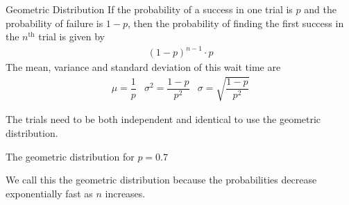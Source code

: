 \documentclass{beamer}
\begin{document}
\begin{frame}
  \begin{block}{Geometric Distribution}
    If the probability of a success in one trial is $p$ and the probability of failure is $1-p$, then the probability of finding the first success in the ${n}^{\text{th}}$ trial is given by
    \begin{equation*}
      \begin{aligned}
        {(1-p)}^{n-1}\cdot p
      \end{aligned}
    \end{equation*}
    The mean, variance and standard deviation of this wait time are
    \begin{equation*}
      \begin{array}{lll}
        \mu=\dfrac{1}{p} &
        \sigma^2=\dfrac{1-p}{p^2} &
        \sigma=\sqrt{\dfrac{1-p}{p^2}}
      \end{array}
    \end{equation*}
  \end{block}\pause

  \begin{note}
    The trials need to be both independent and identical to use the geometric distribution.
  \end{note}
\end{frame}

\begin{frame}
  \begin{example}
    The geometric distribution for $p=0.7$ 
    \begin{center}
    \end{center}
  \end{example}\pause

  \begin{note}
    We call this the geometric distribution because the probabilities decrease exponentially fast as $n$ increases.
  \end{note}
\end{frame}
\end{document}
